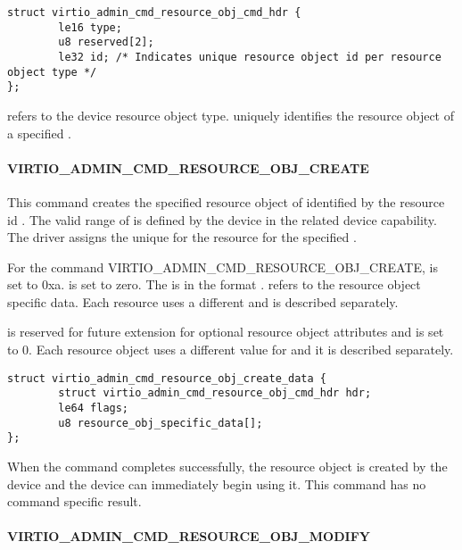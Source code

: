 \begin{lstlisting}
struct virtio_admin_cmd_resource_obj_cmd_hdr {
        le16 type;
        u8 reserved[2];
        le32 id; /* Indicates unique resource object id per resource object type */
};

\end{lstlisting}

 refers to the device resource object type.
 uniquely identifies the resource object of a specified .

\paragraph{VIRTIO_ADMIN_CMD_RESOURCE_OBJ_CREATE}
\label{par:Basic Facilities of a Virtio Device / Device groups / Group administration commands / Device resource objects / VIRTIO_ADMIN_CMD_RESOURCE_OBJ_CREATE}

This command creates the specified resource object of  identified by the
resource id . The valid range of  is defined by the
device in the related device capability. The driver assigns the unique 
for the resource for the specified .

For the command VIRTIO_ADMIN_CMD_RESOURCE_OBJ_CREATE,  is set to 0xa.
 is set to zero.
The  is in the format
.
 refers to the resource object specific data.
Each resource uses a different  and is described
separately.

 is reserved for future extension for optional resource object attributes and
is set to 0. Each resource object uses a different value for
 and it is described separately.

\begin{lstlisting}
struct virtio_admin_cmd_resource_obj_create_data {
        struct virtio_admin_cmd_resource_obj_cmd_hdr hdr;
        le64 flags;
        u8 resource_obj_specific_data[];
};
\end{lstlisting}

When the command completes successfully, the resource object is created by the
device and the device can immediately begin using it.
This command has no command specific result.

\paragraph{VIRTIO_ADMIN_CMD_RESOURCE_OBJ_MODIFY}
\label{par:Basic Facilities of a Virtio Device / Device groups / Group administration commands / Device resource objects / VIRTIO_ADMIN_CMD_RESOURCE_OBJ_MODIFY}

